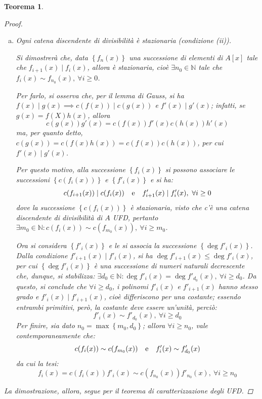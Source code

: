 \documentclass[12pt]{scrartcl}
\theoremstyle{style}
\newtheorem{teorema}{Teorema}[section]
\numberwithin{equation}{subsection}
\begin{document}
\begin{teorema}
\begin{proof}
\begin{enumerate}[(a).]
			\item Ogni catena discendente di divisibilit\`a \`e stazionaria (condizione (ii)).

				Si dimostrer\`a che, data $\left\{ f_n(x) \right\} $ una successione di elementi di $A[x]$ tale che $f_{i+1} (x)  \mid f_i(x)$, allora \`e stazionaria, cio\`e $\exists n_0 \in \mathbb{N}$ tale che $f_i(x) \sim f_{n_0} (x) , \ \forall i\ge 0$.

				Per farlo, si osserva che, per il lemma di Gauss, si ha $f(x)  \mid g(x) \implies c(f(x))  \mid c(g(x)) $ e $f'(x)  \mid g'(x)$; infatti, se $g(x) = f(X) h(x)$, allora
				\[
				c(g(x))g'(x) = c(f(x)) f'(x) c(h(x)) h'(x)
				\] 
				ma, per quanto detto, $c(g(x)) = c(f(x) h(x))= c(f(x)) c(h(x))$, per cui $f'(x)  \mid g'(x)$.

				Per questo motivo, alla successione $\left\{ f_i(x) \right\} $ si possono associare le successioni $\left\{ c(f_i(x)) \right\} $ e $\left\{ f'_i(x) \right\} $ e si ha:
				\[
				c(f_{i+1} (x)) \mid c(f_i(x)) \hspace{.25cm} \text{ e } \hspace{.25cm} f'_{i+1} (x)  \mid f'_i(x) , \ \forall i\ge 0
				\] 
				dove la successione $\left\{ c(f_i(x)) \right\} $ \`e stazionaria, visto che c'\`e una catena discendente di divisibilit\`a di $A$ UFD, pertanto $\exists m_0 \in \mathbb{N} : c(f_i(x)) \sim c(f_{m_0} (x)) , \ \forall i\ge m_0 $.

				Ora si considera $\left\{ f'_i(x) \right\} $ e le si associa la successione $\left\{ \operatorname{deg} f'_i(x) \right\} $.
				Dalla condizione $f'_{i+1} (x)  \mid f'_i(x)  $, si ha $\operatorname{deg} f'_{i+1} (x)  \le \operatorname{deg} f'_i(x)$, per cui $\left\{ \operatorname{deg} f'_i(x) \right\} $ \`e una successione di numeri naturali decrescente che, dunque, si stabilizza: $\exists d_0 \in \mathbb{N} : \operatorname{deg} f'_i(x) = \operatorname{deg} f'_{d_0} (x) ,\ \forall i \ge d_0$.
				Da questo, si conclude che $\forall i\ge d_0$, i polinomi $f'_i(x)$ e $f'_{i+1} (x)$ hanno stesso grado e $f'_i(x)  \mid f'_{i+1} (x)$, cio\`e differiscono per una costante; essendo entrambi primitivi, per\`o, la costante deve essere un'unit\`a, perci\`o:
				\[
				f'_i(x) \sim f'_{d_0} (x), \ \forall i \ge d_0
				\] 
				Per finire, sia dato $n_0 = \max \left\{ m_0,d_0 \right\}$; allora $\forall i\ge n_0$, vale contemporaneamente che:
				\[
				c(f_i(x)) \sim c(f_{m_0} (x)) \hspace{.25cm} \text{ e } \hspace{.25cm} f'_i(x) \sim f'_{d_0} (x)
				\] 
				da cui la tesi:
				\[
				f_i(x) = c(f_i(x)) f'_i(x) \sim c(f_{n_0} (x)) f'_{n_0} (x) , \ \forall i\ge n_0
				\] 
		\end{enumerate}
		La dimostrazione, allora, segue per il teorema di caratterizzazione degli UFD.
	\end{proof}
\end{teorema}
\end{document}
